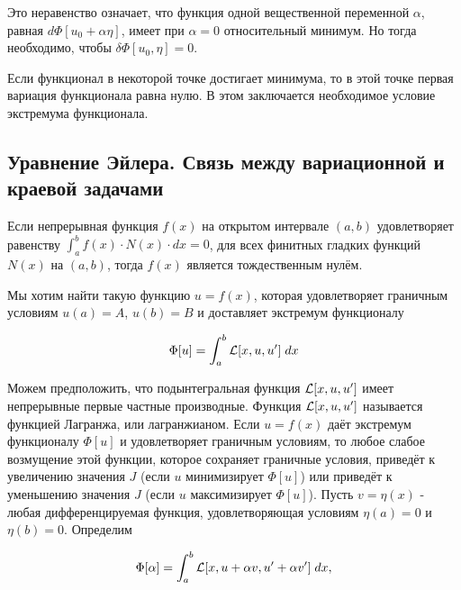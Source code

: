 \documentclass{article}
\begin{document}
\noindent Это неравенство означает, что функция одной вещественной переменной $\alpha$, равная $d\Phi[u_{0} + \alpha\eta]$, имеет при $\alpha = 0$ относительный минимум. Но тогда необходимо, чтобы  $\delta \Phi[u_{0}, \eta] = 0$.

\begin{warn}[Важно!]
	Если функционал в некоторой точке достигает минимума, то в этой точке первая вариация функционала равна нулю. В этом заключается необходимое условие экстремума функционала.
\end{warn}


\subsection{Уравнение Эйлера. Связь между вариационной и краевой задачами}

\begin{warn}
	Если непрерывная функция $f(x)$ на открытом интервале $(a, b)$ удовлетворяет равенству $\int_{a}^{b} f(x) \cdot N(x) \cdot dx = 0$, 
	\noindent для всех финитных гладких функций $N(x)$ на $(a, b)$, тогда $f(x)$ является тождественным нулём.
\end{warn}

Мы хотим найти такую функцию $u = f(x)$, которая удовлетворяет граничным условиям $u(a) = A$, $u(b) = B$ и доставляет экстремум функционалу

\begin{displaymath}
	\Phi[u] = \int_{a}^{b} \mathcal{L}[x, u, u'] \; dx
\end{displaymath}

Можем предположить, что подынтегральная функция $\mathcal{L}[x, u, u']$ имеет непрерывные первые частные производные. Функция $\mathcal{L}[x, u, u']$ называется функцией Лагранжа, или лагранжианом. Если $u = f(x)$ даёт экстремум функционалу $\Phi[u]$ и удовлетворяет граничным условиям, то любое слабое возмущение этой функции, которое сохраняет граничные условия, приведёт к увеличению значения $J$ (если $u$ минимизирует $\Phi[u]$) или приведёт к уменьшению значения $J$ (если $u$ максимизирует $\Phi[u]$).
Пусть $v = \eta(x)$ - любая дифференцируемая функция, удовлетворяющая условиям $\eta(a) = 0$ и $\eta(b) = 0$.
Определим

\begin{displaymath}
	\Phi[\alpha] = \int_{a}^{b} \mathcal{L}[x, u + \alpha v, u' +  \alpha v'] \; dx,
\end{displaymath}
\end{document}
